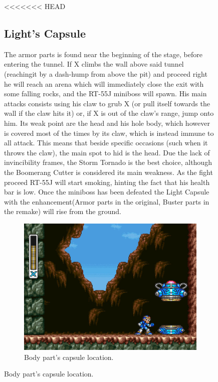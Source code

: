 \begin{figure}[htp]
<<<<<<< HEAD
\subsection{Light's Capsule}
The armor parts is found near the beginning of the stage, before entering the tunnel. If X climbs the wall above said tunnel (reachingit by a dash-hump from above the pit) and proceed right he will reach an arena which will immediately close the exit with some falling rocks, and the RT-55J miniboss will spawn. His main attacks consists using his claw to grub X (or pull itself towards the wall if the claw hits it) or, if X is out of the claw's range, jump onto him. Its weak point are the head and his hole body, which however is covered most of the times by its claw, which is instead immune to all attack. This means that beside specific occasions (such when it throws the claw), the main spot to hid is the head. Due the lack of invincibility frames, the Storm Tornado is the best choice, although the Boomerang Cutter is considered its main weakness\cite{wiki:RT55J}. As the fight proceed RT-55J will start smoking, hinting the fact that his health bar is low. Once the miniboss has been defeated the Light Capsule with the enhancement(Armor parts in the original, Buster parts in the remake) will rise from the ground.
\begin{figure}[htp]
	\centering
	\includegraphics[width=0.5\linewidth]{figures/X1/Sting_chameleon/Sting_armor_capsule.jpg}
	\caption{Body part's capsule location.}
\end{figure}


\end{figure}
